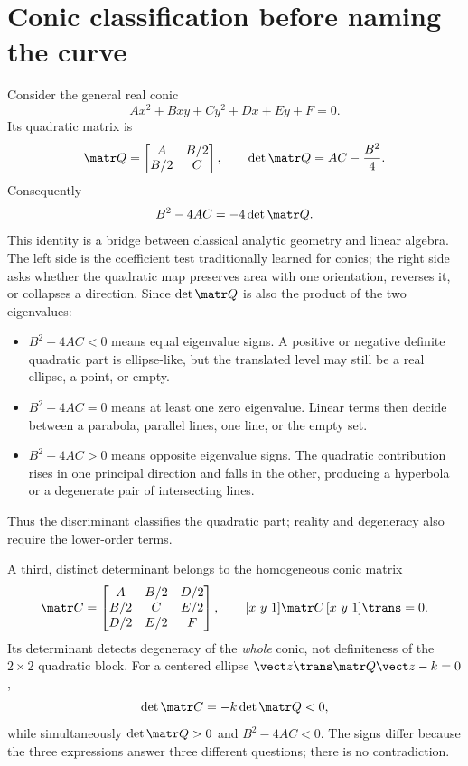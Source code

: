 \section{Conic classification before naming the curve}

Consider the general real conic
\begin{equation}
 Ax^2+Bxy+Cy^2+Dx+Ey+F=0.\label{eq:general-conic}
\end{equation}
Its quadratic matrix is
\begin{equation}
 \matr Q=\begin{bmatrix}A&B/2\\B/2&C\end{bmatrix},\qquad
 \det\matr Q=AC-\frac{B^2}{4}.
\end{equation}
Consequently
\begin{equation}
 B^2-4AC=-4\det\matr Q.\label{eq:disc-det}
\end{equation}
This identity is a bridge between classical analytic geometry and linear
algebra.  The left side is the coefficient test traditionally learned for
conics; the right side asks whether the quadratic map preserves area with one
orientation, reverses it, or collapses a direction.  Since
$\det\matr Q$ is also the product of the two eigenvalues:
\begin{itemize}
 \item $B^2-4AC<0$ means equal eigenvalue signs.  A positive or negative
       definite quadratic part is ellipse-like, but the translated level may
       still be a real ellipse, a point, or empty.
 \item $B^2-4AC=0$ means at least one zero eigenvalue.  Linear terms then decide
       between a parabola, parallel lines, one line, or the empty set.
 \item $B^2-4AC>0$ means opposite eigenvalue signs.  The quadratic contribution
       rises in one principal direction and falls in the other, producing a
       hyperbola or a degenerate pair of intersecting lines.
\end{itemize}
Thus the discriminant classifies the quadratic part; reality and degeneracy
also require the lower-order terms.

A third, distinct determinant belongs to the homogeneous conic matrix
\begin{equation}
 \matr C=\begin{bmatrix}
 A&B/2&D/2\\ B/2&C&E/2\\ D/2&E/2&F
 \end{bmatrix},\qquad
 [x\ y\ 1]\matr C\,[x\ y\ 1]\trans=0.
\end{equation}
Its determinant detects degeneracy of the \emph{whole} conic, not definiteness
of the $2\times2$ quadratic block.  For a centered ellipse
$\vect z\trans\matr Q\vect z-k=0$,
\begin{equation}
 \det\matr C=-k\det\matr Q<0,
\end{equation}
while simultaneously $\det\matr Q>0$ and $B^2-4AC<0$.  The signs differ
because the three expressions answer three different questions; there is no
contradiction.

